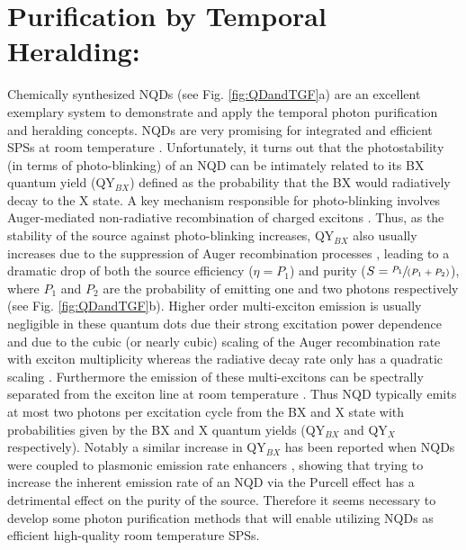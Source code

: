 \documentclass[journal=nalefd,manuscript=letter]{achemso}
\begin{document}
\section{Purification by Temporal Heralding:}
Chemically synthesized NQDs (see Fig. \ref{fig:QDandTGF}a) are an excellent exemplary system to demonstrate and apply the temporal photon purification and heralding concepts.
NQDs are very promising for integrated and efficient SPSs at room temperature \cite{Brokmann2004ColloidalSources,Livneh2015EfficientNanoantenna,Livneh2016,Lin2017Electrically-drivenTemperature,Chandrasekaran2017NearlyDots}.
Unfortunately, it turns out that the photostability (in terms of photo-blinking) of an NQD can be intimately related to its BX quantum yield (QY$_{BX}$) defined as the probability that the BX would radiatively decay to the X state.
A key mechanism responsible for photo-blinking involves Auger-mediated non-radiative recombination of charged excitons \cite{Efros2016OriginDots}.
Thus, as the stability of the source against photo-blinking increases,  QY$_{BX}$ also usually increases due to the suppression of Auger recombination processes \cite{Efros2016OriginDots}, leading to a dramatic drop of both the source efficiency ($\eta=P_1$) and purity ($S=\sfrac{P_1}{(P_1+P_2)}$), where $P_1$ and $P_2$ are the probability of emitting one and two photons respectively (see Fig. \ref{fig:QDandTGF}b). 
Higher order multi-exciton emission is usually negligible in these quantum dots due their strong excitation power dependence and due to the cubic (or nearly cubic) scaling of the Auger recombination rate with exciton multiplicity whereas the radiative decay rate only has a quadratic scaling \cite{Htoon2010HighlyNanocrystals}. 
Furthermore the emission of these multi-excitons can be spectrally separated from the exciton line at room temperature \cite{Htoon2010HighlyNanocrystals}.
Thus NQD typically emits at most two photons per excitation cycle from the BX and X state with probabilities given by the BX and X quantum yields (QY$_{BX}$ and QY$_X$ respectively). 
Notably a similar increase in QY$_{BX}$ has been reported when NQDs were coupled to plasmonic emission rate enhancers \cite{Park2013Single-NanocrystalTemperature,Wang2015CorrelatedPathways,Dey2016PlasmonicDots}, showing that trying to increase the inherent emission rate of an NQD via the Purcell effect  has a detrimental effect on the purity of the source. 
Therefore it seems necessary to develop some photon purification methods that will enable utilizing NQDs as efficient high-quality room temperature SPSs. 
   
\end{document}

